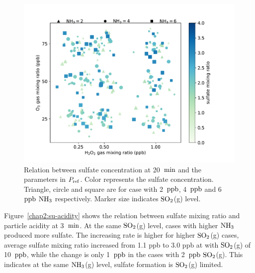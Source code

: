 \documentclass[edeposit,fullpage]{uiucthesis2009}
\makeatletter
\DeclareRobustCommand*\unit[1]
 {\ensuremath{%
   {\thinmuskip3mu\relax
    \def\mu{\text{\textmu}}\def~{\,}%
    \ifx\f@series\testbx\mathbf{#1}\else\mathrm{#1}\fi}}}
\makeatother
\begin{document}
\begin{figure}[ht]
    \centering \includegraphics[scale=0.7]{chap2_figs/chap2_fig3_sulfate_scatter.pdf}
    \caption{Relation between sulfate concentration at 20~\unit{min} and the parameters in $P_{\rm ref}$. Color represents the sulfate concentration. Triangle, circle and square are for case with 2~\unit{ppb},  4~\unit{ppb} and 6~\unit{ppb} $\rm NH_3$ respectively. Marker size indicates $\rm SO_2$(g) level.}
    \label{chap2:factor}
\end{figure}

Figure~\ref{chap2:su-acidity} shows the relation between sulfate mixing ratio and particle acidity at 3~\unit{min}. At the same $\rm SO_2$(g) level, cases with higher $\rm NH_3$ produced more sulfate. The increasing rate is higher for higher $\rm SO_2$(g) cases, average sulfate mixing ratio increased from 1.1 ppb to 3.0 ppb at with $\rm SO_2$(g) of 10~\unit{ppb}, while the change is only 1~\unit{ppb} in the cases with 2~\unit{ppb} $\rm SO_2$(g). This indicates at the same $\rm NH_3$(g) level, sulfate formation is $\rm SO_2$(g) limited. 
\end{document}
